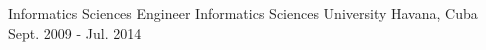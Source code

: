 


\begin{cventries}


\cventry
{Informatics Sciences Engineer} %
{Informatics Sciences University} %
{Havana, Cuba} %
{Sept. 2009 - Jul. 2014} %
{ %
}


\end{cventries}
